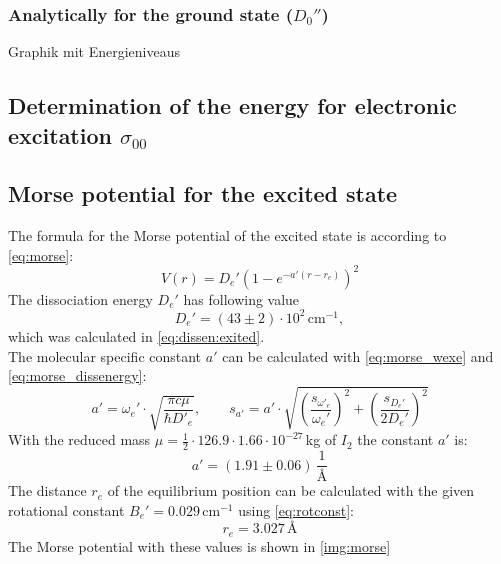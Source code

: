 \subsubsection{Analytically for the ground state ($D_0''$)}

Graphik mit Energieniveaus

\subsection{Determination of the energy for electronic excitation \texorpdfstring{$\sigma_{00}$}{s00}}

\subsection{Morse potential for the excited state}
The formula for the Morse potential of the excited state is according to \autoref{eq:morse}:
\begin{equation}
  V(r) = D_e' \left( 1 - e^{-a'(r-r_e)} \right)^2
\end{equation}
The dissociation energy $D_e'$ has following value
\begin{equation}
  D_e' = (43 \pm 2) \cdot 10^2\, \text{cm}^{-1},
\end{equation}
which was calculated in \autoref{eq:dissen:exited}. \\
The molecular specific constant $a'$ can be calculated with \autoref{eq:morse_wexe} and \autoref{eq:morse_dissenergy}:
\begin{equation}
  a' = \omega_e' \cdot \sqrt{\frac{\pi c \mu}{\hbar D'_e}}, \qquad s_{a'} = 
  a' \cdot \sqrt{\left( \frac{s_{\omega'_e}}{\omega_e'} \right)^2 +  \left( \frac{s_{D_e'}}{2 D_e'} \right)^2 }
\end{equation}
With the reduced mass $\mu = \frac{1}{2} \cdot 126.9 \cdot 1.66 \cdot 10^{-27}\,$kg of $I_2$ the constant $a'$ is:
\begin{equation}
  a' = (1.91 \pm 0.06)\, \frac{1}{\text{\AA}}
\end{equation}
The distance $r_e$ of the equilibrium position can be calculated with the given rotational constant $B_e' = 0.029\, \text{cm}^{-1}$ using 
\autoref{eq:rotconst}:
\begin{equation}
  r_e = 3.027\,\text{\AA}
\end{equation}
The Morse potential with these values is shown in \autoref{img:morse}

